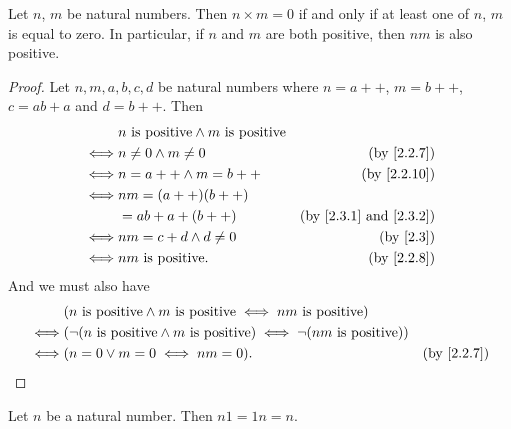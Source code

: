 \begin{lem}\label{2.3.3}
  Let \(n\), \(m\) be natural numbers.
  Then \(n \times m = 0\) if and only if at least one of \(n\), \(m\) is equal to zero.
  In particular, if \(n\) and \(m\) are both positive, then \(nm\) is also positive.
\end{lem}

\begin{proof}
  Let \(n, m, a, b, c, d\) be natural numbers where \(n = a++\), \(m = b++\), \(c = ab + a\) and \(d = b++\).
  Then
  \begin{align*}
         & n \text{ is positive} \land m \text{ is positive}                                             \\
    \iff & n \neq 0 \land m \neq 0                           & \text{(by \cref{2.2.7})}                  \\
    \iff & n = a++ \land m = b++                             & \text{(by \cref{2.2.10})}                 \\
    \iff & nm = (a++)(b++)                                                                               \\
         & = ab + a + (b++)                                  & \text{(by \cref{2.3.1} and \cref{2.3.2})} \\
    \iff & nm = c + d \land d \neq 0                         & \text{(by \cref{2.3})}                    \\
    \iff & nm \text{ is positive}.                           & \text{(by \cref{2.2.8})}
  \end{align*}
  And we must also have
  \begin{align*}
         & (n \text{ is positive} \land m \text{ is positive} \iff nm \text{ is positive})                                            \\
    \iff & (\lnot (n \text{ is positive} \land m \text{ is positive}) \iff \lnot (nm \text{ is positive}))                            \\
    \iff & (n = 0 \lor m = 0 \iff nm = 0).                                                                 & \text{(by \cref{2.2.7})}
  \end{align*}
\end{proof}

\begin{ac}\label{ac:2.3.4}
  Let \(n\) be a natural number.
  Then \(n1 = 1n = n\).
\end{ac}

